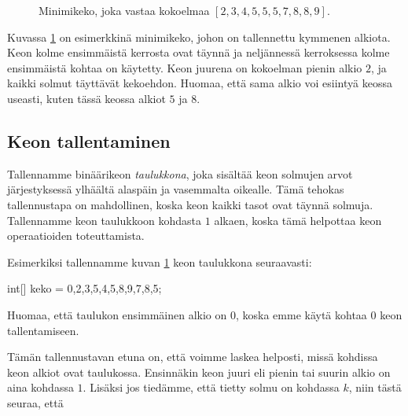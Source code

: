 \begin{figure}
\center
{}
\caption{Minimikeko, joka vastaa kokoelmaa $[2,3,4,5,5,5,7,8,8,9]$.}
\label{fig:minkek}
\end{figure}


Kuvassa \ref{fig:minkek} on esimerkkinä minimikeko,
johon on tallennettu kymmenen alkiota.
Keon kolme ensimmäistä kerrosta ovat täynnä
ja neljännessä kerroksessa kolme ensimmäistä kohtaa on käytetty.
Keon juurena on kokoelman pienin alkio $2$,
ja kaikki solmut täyttävät kekoehdon.
Huomaa, että sama alkio voi esiintyä keossa useasti,
kuten tässä keossa alkiot $5$ ja $8$.

\subsection{Keon tallentaminen}

Tallennamme binäärikeon \emph{taulukkona},
joka sisältää keon solmujen arvot jär\-jestyksessä
ylhäältä alaspäin ja vasemmalta oikealle.
Tämä tehokas tallennustapa on mahdollinen,
koska keon kaikki tasot ovat täynnä solmuja.
Tallennamme keon taulukkoon kohdasta $1$ alkaen,
koska tämä helpottaa keon operaatioiden toteuttamista.

Esimerkiksi tallennamme kuvan \ref{fig:minkek}
keon taulukkona seuraavasti:

\begin{code}
int[] keko = {0,2,3,5,4,5,8,9,7,8,5};
\end{code}

Huomaa, että taulukon ensimmäinen alkio on $0$,
koska emme käytä kohtaa $0$ keon tallentamiseen.

Tämän tallennustavan etuna on, että voimme laskea
helposti, missä kohdissa keon alkiot ovat taulukossa.
Ensinnäkin keon juuri eli pienin tai suurin alkio
on aina kohdassa $1$.
Lisäksi jos tiedämme, että tietty solmu on kohdassa $k$,
niin tästä seuraa, että

